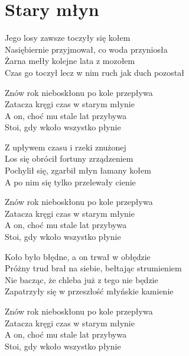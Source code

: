 \section{Stary młyn}
\begin{text}
Jego losy zawsze toczyły się kołem\\
Nasiębiernie przyjmował, co woda przyniosła\\
Żarna mełły kolejne lata z mozołem\\
Czas go toczył lecz w nim ruch jak duch pozostał

Znów rok nieboskłonu po kole przepływa\\
Zatacza kręgi czas w starym młynie\\
A on, choć mu stale lat przybywa\\
Stoi, gdy wkoło wszystko płynie

Z upływem czasu i rzeki znużonej\\
Los się obrócił fortuny zrządzeniem\\
Pochylił się, zgarbił młyn łamany kołem\\
A po nim się tylko przelewały cienie

Znów rok nieboskłonu po kole przepływa\\
Zatacza kręgi czas w starym młynie\\
A on, choć mu stale lat przybywa\\
Stoi, gdy wkoło wszystko płynie

Koło było błędne, a on trwał w obłędzie\\
Próżny trud brał na siebie, bełtając strumieniem\\
Nie bacząc, że chleba już z tego nie będzie\\
Zapatrzyły się w przeszłość młyńskie kamienie

Znów rok nieboskłonu po kole przepływa\\
Zatacza kręgi czas w starym młynie\\
A on, choć mu stale lat przybywa\\
Stoi, gdy wkoło wszystko płynie
\end{text}